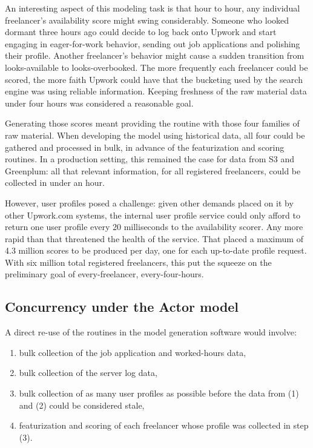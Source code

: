 \documentclass{article}
\begin{document}
 An interesting aspect of this modeling task is that hour to hour, any
individual freelancer's availability score might swing considerably. Someone who
looked dormant three hours ago could decide to log back onto Upwork and start
engaging in eager-for-work behavior, sending out job applications and polishing
their profile. Another freelancer's behavior might cause a sudden transition
from looks-available to looks-overbooked. The more frequently each freelancer
could be scored, the more faith Upwork could have that the bucketing used by the
search engine was using reliable information. Keeping freshness of the raw
material data under four hours was considered a reasonable goal.

 Generating those scores meant providing the routine with those four families of
raw material. When developing the model using historical data, all four could be
gathered and processed in bulk, in advance of the featurization and scoring
routines. In a production setting, this remained the case for data from S3 and
Greenplum: all that relevant information, for all registered freelancers, could
be collected in under an hour.

 However, user profiles posed a challenge: given other demands placed on it by
other Upwork.com systems, the internal user profile service could only afford to
return one user profile every 20 milliseconds to the availability scorer. Any
more rapid than that threatened the health of the service. That placed a maximum
of 4.3 million scores to be produced per day, one for each up-to-date profile
request. With six million total registered freelancers, this put the squeeze on
the preliminary goal of every-freelancer, every-four-hours.

\subsection{Concurrency under the Actor model}

 A direct re-use of the routines in the model generation software would involve:

\begin{enumerate}
\item bulk collection of the job application and worked-hours data,
\item bulk collection of the server log data,
 \item bulk collection of as many user profiles as possible before the data from
(1) and (2) could be considered stale,
 \item featurization and scoring of each freelancer whose profile was collected
in step (3).
\end{enumerate}
\end{document}
